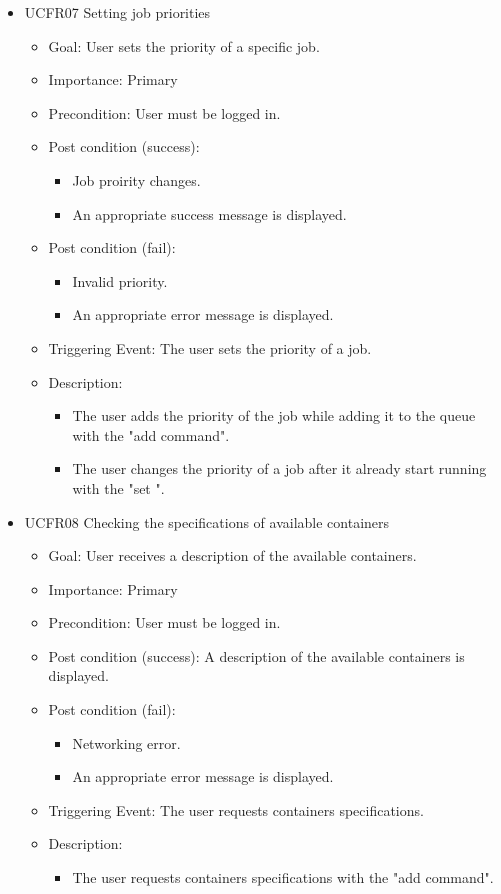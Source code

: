 \begin{itemize}
    \item UCFR07 Setting job priorities
    \begin{itemize}
      \item Goal: User sets the priority of a specific job.
      \item Importance: Primary
      \item Precondition: User must be logged in.
      \item Post condition (success): 
      \begin{itemize}
        \item Job proirity changes.
        \item An appropriate success message is displayed.
      \end{itemize}  
      \item Post condition (fail):
      \begin{itemize}
        \item Invalid priority.
        \item An appropriate error message is displayed.
      \end{itemize}
      \item Triggering Event: The user sets the priority of a job.
      \item Description:
      \begin{itemize}
        \item The user adds the priority of the job while adding it to the queue with the "add command".
        \item The user changes the priority of a job after it already start running with the "set ".
      \end{itemize}
    \end{itemize}


    \item UCFR08 Checking the specifications of available containers
    \begin{itemize}
      \item Goal: User receives a description of the available containers.
      \item Importance: Primary
      \item Precondition: User must be logged in.
      \item Post condition (success): A description of the available containers is displayed.
      \item Post condition (fail):
      \begin{itemize}
        \item Networking error.
        \item An appropriate error message is displayed.
      \end{itemize}
      \item Triggering Event: The user requests containers specifications.
      \item Description:
      \begin{itemize}
        \item The user requests containers specifications with the "add command".
      \end{itemize}
    \end{itemize}


\end{itemize}
